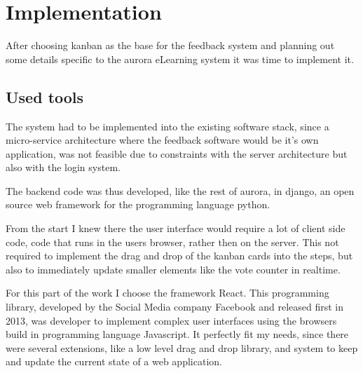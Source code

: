 \chapter{Implementation}

After choosing kanban as the base for the feedback system and planning out some details specific to the aurora eLearning system it was time to implement it.

\section{Used tools}

The system had to be implemented into the existing software stack, since a micro-service architecture where the feedback software would be it's own application, was not feasible due to constraints with the server architecture but also with the login system. 

The backend code was thus developed, like the rest of aurora, in django, an open source web framework for the programming language python. 

From the start I knew there the user interface would require a lot of client side code, code that runs in the users browser, rather then on the server. This not required to implement the drag and drop of the kanban cards into the steps, but also to immediately update smaller elements like the vote counter in realtime. 

For this part of the work I choose the framework React. This programming library, developed by the Social Media company Facebook and released first in 2013, was developer to implement complex user interfaces using the browsers build in programming language Javascript. It perfectly fit my needs, since there were several extensions, like a low level drag and drop library, and system to keep and update the current state of a web application.
